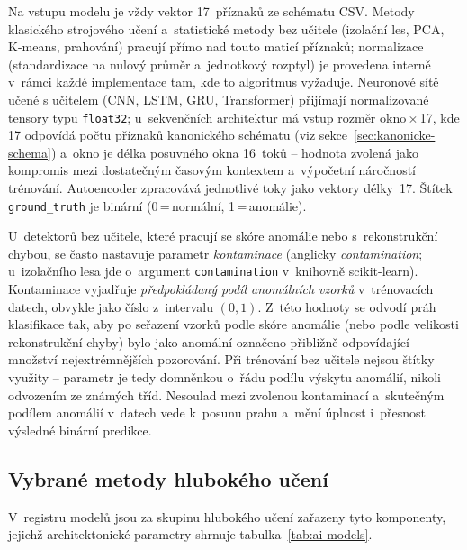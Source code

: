 Na vstupu modelu je vždy vektor 17~příznaků ze schématu CSV. Metody klasického strojového učení a~statistické metody bez učitele (izolační les, PCA, K-means, prahování) pracují přímo nad touto maticí příznaků; normalizace (standardizace na nulový průměr a~jednotkový rozptyl) je provedena interně v~rámci každé implementace tam, kde to algoritmus vyžaduje. Neuronové sítě učené s učitelem (CNN, LSTM, GRU, Transformer) přijímají normalizované tensory typu \texttt{float32}; u~sekvenčních architektur má vstup rozměr okno\,$\times$\,17, kde 17 odpovídá počtu příznaků kanonického schématu (viz sekce~\ref{sec:kanonicke-schema}) a~okno je délka posuvného okna 16~toků -- hodnota zvolená jako kompromis mezi dostatečným časovým kontextem a~výpočetní náročností trénování. Autoencoder zpracovává jednotlivé toky jako vektory délky~17. Štítek \texttt{ground\_truth} je binární (0\,=\,normální, 1\,=\,anomálie).

U~detektorů bez učitele, které pracují se skóre anomálie nebo s~rekonstrukční chybou, se často nastavuje parametr \emph{kontaminace} (anglicky \emph{contamination}; u~izolačního lesa jde o~argument \texttt{contamination} v~knihovně scikit-learn). Kontaminace vyjadřuje \emph{předpokládaný podíl anomálních vzorků} v~trénovacích datech, obvykle jako číslo z~intervalu $(0, 1)$. Z~této hodnoty se odvodí práh klasifikace tak, aby po seřazení vzorků podle skóre anomálie (nebo podle velikosti rekonstrukční chyby) bylo jako anomální označeno přibližně odpovídající množství nejextrémnějších pozorování. Při trénování bez učitele nejsou štítky využity -- parametr je tedy domněnkou o~řádu podílu výskytu anomálií, nikoli odvozením ze známých tříd. Nesoulad mezi zvolenou kontaminací a~skutečným podílem anomálií v~datech vede k~posunu prahu a~mění úplnost i~přesnost výsledné binární predikce.

\subsection{Vybrané metody hlubokého učení}
\label{sec:ai-algoritmy}

V~registru modelů jsou za skupinu hlubokého učení zařazeny tyto komponenty, jejichž architektonické parametry shrnuje tabulka~\ref{tab:ai-models}.

